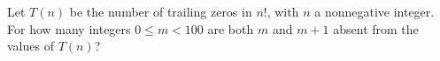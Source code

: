 Let $T(n)$ be the number of trailing zeros in $n!$, with $n$ a nonnegative integer. For how many integers $0\le m<100$ are both $m$ and $m+1$ absent from the values of $T(n)$?
